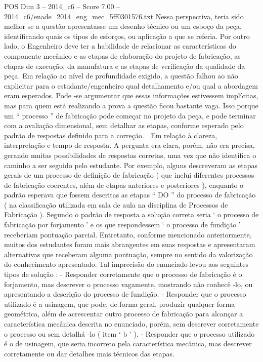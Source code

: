 \begin{textsample}{POS Dim 3 – 2014\_c6 – Score 7.00 – 2014\_c6/enade\_2014\_eng\_mec\_5ff0301576.txt}
Nessa perspectiva, teria sido melhor se a questão apresentasse um desenho técnico ou um esboço da peça, identificando quais os tipos de esforços, ou aplicação a que se referia.
Por outro lado, o Engenheiro deve ter a habilidade de relacionar as características do componente mecânico e as etapas de elaboração do projeto de fabricação, as etapas de execução, da manufatura e as etapas de verificação da qualidade da peça.
Em relação ao nível de profundidade exigido, a questão falhou ao não explicitar para o estudante/engenheiro qual detalhamento e/ou qual a abordagem eram esperados.
Pode -se argumentar que essas informações estivessem implícitas, mas para quem está realizando a prova a questão ficou bastante vaga.
Isso porque um “ processo ” de fabricação pode começar no projeto da peça, e pode terminar com a avaliação dimensional, sem detalhar as etapas, conforme esperado pelo padrão de respostas definido para a correção.  Em relação à clareza, interpretação e tempo de resposta.
A pergunta era clara, porém, não era precisa, gerando muitas possibilidades de respostas corretas, uma vez que não identifica o caminho a ser seguido pelo estudante.
Por exemplo, alguns descreveram as etapas gerais de um processo de definição de fabricação ( que inclui diferentes processos de fabricação coerentes, além de etapas anteriores e posteriores ), enquanto o padrão esperava que fossem descritas as etapas “ DO ” do processo de fabricação ( na classificação utilizada em sala de aula na disciplina de Processos de Fabricação ).
Segundo o padrão de resposta a solução correta seria ‘ o processo de fabricação por forjamento ’ e os que respondessem ‘ o processo de fundição ’ receberiam pontuação parcial.
Entretanto, conforme mencionado anteriormente, muitos dos estudantes foram mais abrangentes em suas respostas e apresentaram alternativas que receberam alguma pontuação, sempre no sentido da valorização do conhecimento apresentado.
Tal imprecisão do enunciado levou aos seguintes tipos de solução : - Responder corretamente que o processo de fabricação é o forjamento, mas descrever o processo vagamente, mostrando não conhecê -lo, ou apresentando a descrição do processo de fundição. - Responder que o processo utilizado é a usinagem, que pode, de forma geral, produzir qualquer forma geométrica, além de acrescentar outro processo de fabricação para alcançar a característica mecânica descrita no enunciado, porém, sem descrever corretamente o processo ou sem detalhá -lo ( item ‘ b ’ ). - Responder que o processo utilizado é o de usinagem, que seria incorreto pela característica mecânica, mas descrever corretamente ou dar detalhes mais técnicos das etapas.

\end{textsample}
